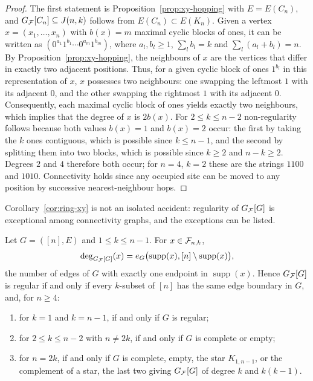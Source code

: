 {\begin{proof}
The first statement is Proposition~\ref{prop:xy-hopping} with $E=E(C_n)$, and $G_{\mathcal{F}}[C_n]\subseteq J(n,k)$ follows from $E(C_n)\subset E(K_n)$. Given a vertex $x=(x_1,\dots,x_n)$ with $b(x)=m$ maximal cyclic blocks of ones, it can be written as $(0^{a_1}1^{b_1}\cdots 0^{a_m}1^{b_m})$, where $a_l,b_l\ge1$, $\sum_l b_l=k$ and $\sum_l(a_l+b_l)=n$. By Proposition~\ref{prop:xy-hopping}, the neighbours of $x$ are the vertices that differ in exactly two adjacent positions. Thus, for a given cyclic block of ones $1^{b_l}$ in this representation of $x$, $x$ possesses two neighbours: one swapping the leftmost $1$ with its adjacent $0$, and the other swapping the rightmost $1$ with its adjacent $0$. Consequently, each maximal cyclic block of ones yields exactly two neighbours, which implies that the degree of $x$ is $2b(x)$. For $2\le k\le n-2$ non-regularity follows because both values $b(x)=1$ and $b(x)=2$ occur: the first by taking the $k$ ones contiguous, which is possible since $k\le n-1$, and the second by splitting them into two blocks, which is possible since $k\ge2$ and $n-k\ge2$. Degrees $2$ and $4$ therefore both occur; for $n=4$, $k=2$ these are the strings $1100$ and $1010$. Connectivity holds since any occupied site can be moved to any position by successive nearest-neighbour hops.
\end{proof}

Corollary~\ref{cor:ring-xy} is not an isolated accident: regularity of $G_{\mathcal{F}}[G]$ is exceptional among connectivity graphs, and the exceptions can be listed.

\begin{proposition}
\label{prop:xy-regularity}
Let $G=([n],E)$ and $1\le k\le n-1$. For $x\in\mathcal{F}_{n,k}$,
\begin{equation}
    \deg_{G_{\mathcal{F}}[G]}(x)
    =
    e_G\bigl(\operatorname{supp}(x),[n]\setminus\operatorname{supp}(x)\bigr),
    \label{eq:boundary-degree}
\end{equation}
the number of edges of $G$ with exactly one endpoint in $\operatorname{supp}(x)$. Hence $G_{\mathcal{F}}[G]$ is regular if and only if every $k$-subset of $[n]$ has the same edge boundary in $G$, and, for $n\ge4$:
\begin{enumerate}
\item[(i)] for $k=1$ and $k=n-1$, if and only if $G$ is regular;
\item[(ii)] for $2\le k\le n-2$ with $n\neq2k$, if and only if $G$ is
complete or empty;
\item[(iii)] for $n=2k$, if and only if $G$ is complete, empty, the star
$K_{1,n-1}$, or the complement of a star, the last two giving $G_{\mathcal{F}}[G]$ of degree $k$ and $k(k-1)$.
\end{enumerate}
\end{proposition}

}
